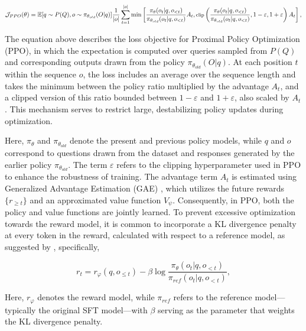 \begin{itemize}[topsep=0pt]
\begin{itemize}[topsep=0pt]
\begin{equation}
\footnotesize
    \mathcal{J}_{PPO}(\theta) = \mathbb{E}{[q \sim P(Q), o \sim \pi_{\theta_{old}}(O|q)]} \frac{1}{|o|} \sum_{t=1}^{|o|} \min \left[ \frac{\pi_\theta(o_{t} | q, o_{<t})}{\pi_{\theta_{old}}(o_{t} | q, o_{<t})} A_{t}, \text{clip} \left( \frac{\pi_\theta(o_{t} | q, o_{<t})}{\pi_{\theta_{old}}(o_{t} | q, o_{<t})}, 1 - \varepsilon, 1 + \varepsilon \right)  A_{t} \right] ,
\end{equation}

The equation above describes the loss objective for Proximal Policy Optimization (PPO), in which the expectation is computed over queries sampled from $P(Q)$ and corresponding outputs drawn from the policy $\pi_{\theta_{old}}(O|q)$. At each position $t$ within the sequence $o$, the loss includes an average over the sequence length and takes the minimum between the policy ratio multiplied by the advantage $A_t$, and a clipped version of this ratio bounded between $1 - \varepsilon$ and $1 + \varepsilon$, also scaled by $A_t$. This mechanism serves to restrict large, destabilizing policy updates during optimization.

Here, $\pi_{\theta}$ and $\pi_{\theta_{old}}$ denote the present and previous policy models, while $q$ and $o$ correspond to questions drawn from the dataset and responses generated by the earlier policy $\pi_{\theta_{old}}$. The term $\varepsilon$ refers to the clipping hyperparameter used in PPO to enhance the robustness of training. The advantage term $A_t$ is estimated using Generalized Advantage Estimation (GAE) \citep{gae}, which utilizes the future rewards $\{r_{\ge t}\}$ and an approximated value function $V_{\psi}$. Consequently, in PPO, both the policy and value functions are jointly learned. To prevent excessive optimization towards the reward model, it is common to incorporate a KL divergence penalty at every token in the reward, calculated with respect to a reference model, as suggested by \citep{ouyang2022training}, specifically,

\begin{equation}
    r_{t} = r_\varphi(q, o_{\le t}) - \beta \log\frac{\pi_{\theta}(o_{t}|q, o_{<t})}{\pi_{ref}(o_{t}|q, o_{<t})},
\label{eq:PPO-reward}
\end{equation}

Here, $r_\varphi$ denotes the reward model, while $\pi_{ref}$ refers to the reference model—typically the original SFT model—with $\beta$ serving as the parameter that weights the KL divergence penalty.


\end{itemize}
\end{itemize}
